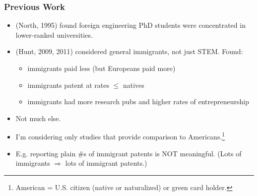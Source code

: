 \documentclass{beamer}
\begin{document}
\begin{frame}
\frametitle{Previous Work}
\pause

\begin{itemize}
 
\item (North, 1995) found foreign engineering PhD students were
concentrated in lower-ranked universities.
\pause

\item (Hunt, 2009, 2011) considered  general immigrants, not just STEM.
Found: 
\pause

   \begin{itemize}

   \item immigrants paid less (but Europeans paid more)
   \pause
   
   \item immigrants patent at rates $\leq$ natives
   \pause

   \item immigrants had more research pubs and higher rates of
   entrepreneurship

   \end{itemize}
\pause

\item Not much else.
\pause

\item I'm considering only studies that provide comparison to
Americans.\footnote{American = U.S. citizen (native or naturalized) or
green card holder.} 
\pause

\item 
E.g. reporting plain \#s of immigrant patents is NOT meaningful.
\pause
(Lots of immigrants $\Rightarrow$ lots of immigrant patents.)

\end{itemize}

\end{frame}
\end{document}
